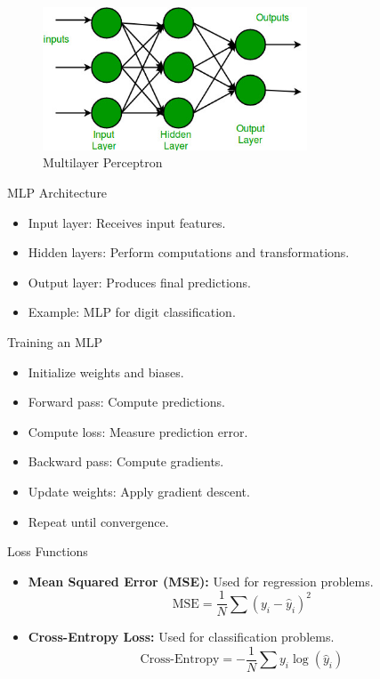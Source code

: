 \documentclass{beamer}
\begin{document}
\begin{frame}
    \begin{figure}
        \centering
        \includegraphics[width=0.7\textwidth]{mlp.png}
        \caption{Multilayer Perceptron}
    \end{figure}
\end{frame}

\begin{frame}{MLP Architecture}
    \begin{itemize}
        \item Input layer: Receives input features.
        \item Hidden layers: Perform computations and transformations.
        \item Output layer: Produces final predictions.
        \item Example: MLP for digit classification.
    \end{itemize}
\end{frame}

\begin{frame}{Training an MLP}
    \begin{itemize}
        \item Initialize weights and biases.
        \item Forward pass: Compute predictions.
        \item Compute loss: Measure prediction error.
        \item Backward pass: Compute gradients.
        \item Update weights: Apply gradient descent.
        \item Repeat until convergence.
    \end{itemize}
\end{frame}

\begin{frame}{Loss Functions}
    \begin{itemize}
        \item \textbf{Mean Squared Error (MSE):} Used for regression problems.
        \[
        \text{MSE} = \frac{1}{N} \sum (y_i - \hat{y}_i)^2
        \]
        \item \textbf{Cross-Entropy Loss:} Used for classification problems.
        \[
        \text{Cross-Entropy} = -\frac{1}{N} \sum y_i \log(\hat{y}_i)
        \]
    \end{itemize}
\end{frame}
\end{document}
